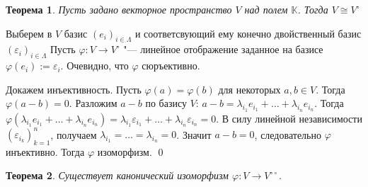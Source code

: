\documentclass[12pt, reqno, a4paper, oneside, notitlepage]{amsart}
\makeatletter
\theoremstyle{mytheoremstyle}
\newtheorem{theorem}{Теорема}[section]
\theoremstyle{myremarkstyle}
\numberwithin{equation}{section}
\renewenvironment{proof}[1][\proofname]{\par\indent {\bfseries #1\@addpunct{.} }}{\qed}
\makeatother
\begin{document}
\begin{theorem}
    Пусть задано векторное пространство $V$ над полем $\mathbb{K}$. Тогда $V \cong V^\circ$
\end{theorem}

\begin{proof}
    Выберем в $V$ базис $(e_i)_{i \in \Lambda}$ и соответсвующий ему конечно двойственный базис $(\varepsilon_i)_{i \in \Lambda}$
    Пусть $\varphi: V \to V^\circ$ "--- линейное отображение заданное на базисе $\varphi(e_i) := \varepsilon_i$. Очевидно, что $\varphi$ сюръективно.

    Докажем инъективность. Пусть $\varphi(a) = \varphi(b)$ для некоторых $a, b \in V$. Тогда $\varphi(a-b) = 0$. Разложим $a-b$ по базису $V$: $a-b = \lambda_{i_1}e_{i_1} + \dots + \lambda_{i_n}e_{i_n}$.
    Тогда $\varphi(\lambda_{i_1}e_{i_1} + \dots + \lambda_{i_n}e_{i_n}) = \lambda_{i_1}\varepsilon_{i_1} + \dots + \lambda_{i_n}\varepsilon_{i_n} = 0$. В силу линейной независимости $(\varepsilon_{i_k})_{k=1}^n$, получаем $\lambda_{i_1} =\dots=\lambda_{i_n} = 0$. Значит $a-b =0$, следовательно $\varphi$ инъективно. Тогда $\varphi$ изоморфизм.
\end{proof}

\begin{theorem}
    Существует канонический изоморфизм $\varphi: V \to V^{\circ\circ}$.
\end{theorem}
\end{document}

